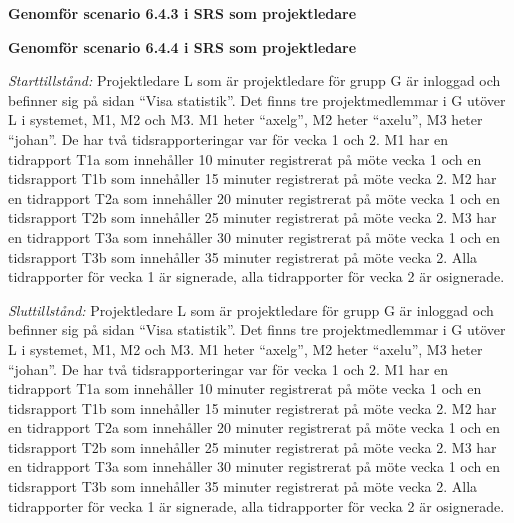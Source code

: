 \documentclass[a4paper]{article}
\begin{document}
\begin{ST}
\begin{enumerate}
\end{enumerate}

\item
\textbf{Genomför scenario 6.4.3 i SRS som projektledare}

\item
\textbf{Genomför scenario 6.4.4 i SRS som projektledare}

\emph{Starttillstånd:} Projektledare L som är projektledare för grupp G är inloggad och befinner sig på sidan ``Visa statistik''. Det finns tre projektmedlemmar i G utöver L i systemet, M1, M2 och M3. M1 heter ``axelg'', M2 heter ``axelu'', M3 heter ``johan''. De har två tidsrapporteringar var för vecka 1 och 2. M1 har en tidrapport T1a som innehåller 10 minuter registrerat på möte vecka 1 och en tidsrapport T1b som innehåller 15 minuter registrerat på möte vecka 2. M2 har en tidrapport T2a som innehåller 20 minuter registrerat på möte vecka 1 och en tidsrapport T2b som innehåller 25 minuter registrerat på möte vecka 2. M3 har en tidrapport T3a som innehåller 30 minuter registrerat på möte vecka 1 och en tidsrapport T3b som innehåller 35 minuter registrerat på möte vecka 2. Alla tidrapporter för vecka 1 är signerade, alla tidrapporter för vecka 2 är osignerade.

\emph{Sluttillstånd:} Projektledare L som är projektledare för grupp G är inloggad och befinner sig på sidan ``Visa statistik''. Det finns tre projektmedlemmar i G utöver L i systemet, M1, M2 och M3. M1 heter ``axelg'', M2 heter ``axelu'', M3 heter ``johan''. De har två tidsrapporteringar var för vecka 1 och 2. M1 har en tidrapport T1a som innehåller 10 minuter registrerat på möte vecka 1 och en tidsrapport T1b som innehåller 15 minuter registrerat på möte vecka 2. M2 har en tidrapport T2a som innehåller 20 minuter registrerat på möte vecka 1 och en tidsrapport T2b som innehåller 25 minuter registrerat på möte vecka 2. M3 har en tidrapport T3a som innehåller 30 minuter registrerat på möte vecka 1 och en tidsrapport T3b som innehåller 35 minuter registrerat på möte vecka 2. Alla tidrapporter för vecka 1 är signerade, alla tidrapporter för vecka 2 är osignerade.


\end{ST}
\end{document}

